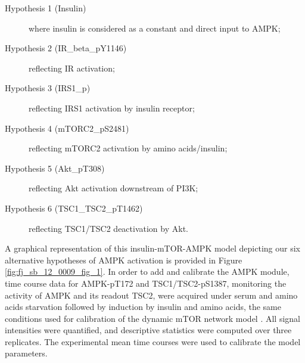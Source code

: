 \begin{description}
 \item [Hypothesis 1 (Insulin)] where insulin is considered as a constant and direct input to AMPK;
 \item [Hypothesis 2 (IR\_beta\_pY1146)] reflecting IR activation;
 \item [Hypothesis 3 (IRS1\_p)] reflecting IRS1 activation by insulin receptor;
 \item [Hypothesis 4 (mTORC2\_pS2481)] reflecting mTORC2 activation by amino acids/insulin;
 \item [Hypothesis 5 (Akt\_pT308)] reflecting Akt activation downstream of PI3K;
 \item [Hypothesis 6 (TSC1\_TSC2\_pT1462)] reflecting TSC1/TSC2 deactivation by Akt.
\end{description}
A graphical representation of this insulin-mTOR-AMPK model depicting our six alternative hypotheses of AMPK activation is provided in Figure \ref{fig:fj_sb_12_0009_fig_1}. In order to add and calibrate the AMPK module, time course data for AMPK-pT172 and TSC1/TSC2-pS1387, monitoring the activity of AMPK and its readout TSC2, were acquired under serum and amino acids starvation followed by induction by insulin and amino acids, the same conditions used for calibration of the dynamic mTOR network model \citep{DallePezze2012a}. All signal intensities were quantified, and descriptive statistics were computed over three replicates. The experimental mean time courses were used to calibrate the model parameters.

